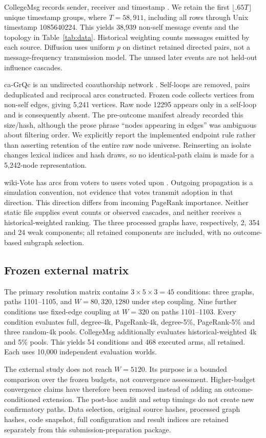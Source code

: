 \documentclass[smallextended]{svjour3}
\begin{document}
CollegeMsg records sender, receiver and timestamp \cite{college}. We retain the first $\lfloor .65T\rfloor$ unique timestamp groups, where $T=58,911$, including all rows through Unix timestamp 1085640224. This yields 38,939 non-self message events and the topology in Table~\ref{tab:data}. Historical weighting counts messages emitted by each source. Diffusion uses uniform $p$ on distinct retained directed pairs, not a message-frequency transmission model. The unused later events are not held-out influence cascades.

ca-GrQc is an undirected coauthorship network \cite{grqc}. Self-loops are removed, pairs deduplicated and reciprocal arcs constructed. Frozen code collects vertices from non-self edges, giving 5,241 vertices. Raw node 12295 appears only in a self-loop and is consequently absent. The pre-outcome manifest already recorded this size/hash, although the prose phrase ``nodes appearing in edges'' was ambiguous about filtering order. We explicitly report the implemented endpoint rule rather than asserting retention of the entire raw node universe. Reinserting an isolate changes lexical indices and hash draws, so no identical-path claim is made for a 5,242-node representation.

wiki-Vote has arcs from voters to users voted upon \cite{signed,links}. Outgoing propagation is a simulation convention, not evidence that votes transmit adoption in that direction. This direction differs from incoming PageRank importance. Neither static file supplies event counts or observed cascades, and neither receives a historical-weighted ranking. The three processed graphs have, respectively, 2, 354 and 24 weak components; all retained components are included, with no outcome-based subgraph selection.

\subsection{Frozen external matrix}
The primary resolution matrix contains $3\times5\times3=45$ conditions: three graphs, paths 1101--1105, and $W=80,320,1280$ under step coupling. Nine further conditions use fixed-edge coupling at $W=320$ on paths 1101--1103. Every condition evaluates full, degree-4k, PageRank-4k, degree-5\%, PageRank-5\% and three random-4k pools. CollegeMsg additionally evaluates historical-weighted 4k and 5\% pools. This yields 54 conditions and 468 executed arms, all retained. Each uses 10,000 independent evaluation worlds.

The external study does not reach $W=5120$. Its purpose is a bounded comparison over the frozen budgets, not convergence assessment. Higher-budget convergence claims have therefore been removed instead of adding an outcome-conditioned extension. The post-hoc audit and setup timings do not create new confirmatory paths. Data selection, original source hashes, processed graph hashes, code snapshot, full configuration and result indices are retained separately from this submission-preparation package.
\end{document}
